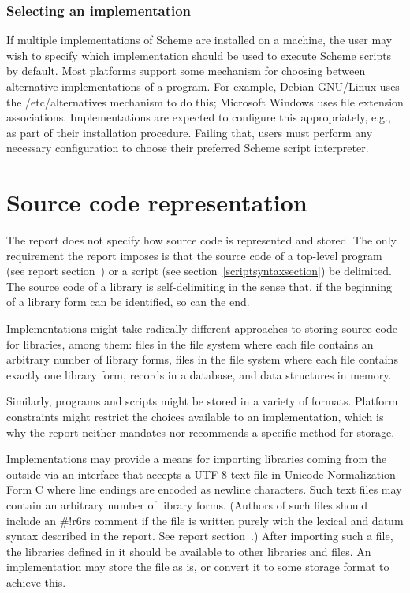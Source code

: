 \documentclass[twoside,twocolumn]{algol60}
\begin{document}
\subsection{Selecting an implementation}
If multiple implementations of Scheme are installed on a machine, the
user may wish to specify which implementation should be used to 
execute Scheme scripts by default.  Most platforms support some 
mechanism for choosing between alternative implementations of a 
program.  For example, Debian GNU/Linux uses the {\cf /etc/alternatives} 
mechanism to do this; Microsoft Windows uses file extension 
associations.  Implementations are expected to configure this 
appropriately, e.g., as part of their installation procedure.
Failing that, users must perform any necessary configuration to 
choose their preferred Scheme script interpreter.

\chapter{Source code representation}
\label{sourcecoderepappendix}

The report does not specify how source code is represented and stored.
The only requirement the report imposes is that the source code of a
top-level program (see report
section~) or a script (see section~\ref{scriptsyntaxsection}) be
delimited.  The source code of a library is self-delimiting in the
sense that, if the beginning of a library form can be identified, so
can the end.

Implementations might take radically different approaches to storing
source code for libraries, among them: files in the file system where
each file contains an arbitrary number of library forms, files in the
file system where each file contains exactly one library form, records
in a database, and data structures in memory.

Similarly, programs and scripts might be stored in a variety of
formats.  Platform constraints might restrict the choices available to
an implementation, which is why the report neither mandates nor
recommends a specific method for storage.

Implementations may provide a means for importing libraries coming
from the outside via an interface that accepts a UTF-8 text file in
Unicode Normalization Form C where line endings are encoded as newline
characters.  Such text files may contain an arbitrary number of
library forms.  (Authors of such files should include an
{\cf\#!r6rs} comment if the file is written purely with the lexical
and datum syntax described in the report.  See report
section~.)  After importing such a file, the libraries defined in
it should be available to other libraries and files.  An
implementation may store the file as is, or convert it to some storage
format to achieve this.
\end{document}
